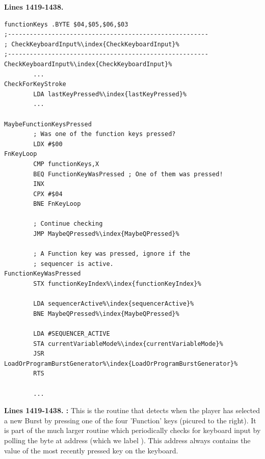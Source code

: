\clearpage
\textbf{Lines 1419-1438. }
\begin{lstlisting}[escapechar=\%]
functionKeys .BYTE $04,$05,$06,$03
;-------------------------------------------------------
; CheckKeyboardInput%\index{CheckKeyboardInput}%
;-------------------------------------------------------
CheckKeyboardInput%\index{CheckKeyboardInput}%   
        ...
CheckForKeyStroke   
        LDA lastKeyPressed%\index{lastKeyPressed}%
        ...

MaybeFunctionKeysPressed   
        ; Was one of the function keys pressed?
        LDX #$00
FnKeyLoop   
        CMP functionKeys,X
        BEQ FunctionKeyWasPressed ; One of them was pressed!
        INX 
        CPX #$04
        BNE FnKeyLoop

        ; Continue checking
        JMP MaybeQPressed%\index{MaybeQPressed}%

        ; A Function key was pressed, ignore if the 
        ; sequencer is active.
FunctionKeyWasPressed   
        STX functionKeyIndex%\index{functionKeyIndex}%

        LDA sequencerActive%\index{sequencerActive}%
        BNE MaybeQPressed%\index{MaybeQPressed}%

        LDA #SEQUENCER_ACTIVE
        STA currentVariableMode%\index{currentVariableMode}%
        JSR LoadOrProgramBurstGenerator%\index{LoadOrProgramBurstGenerator}%
        RTS 

        ...
\end{lstlisting}
\clearpage

\begin{figure}
%
\end{figure}
\textbf{Lines 1419-1438. :} This is the routine that detects when the player has selected a new
Burst by pressing one of the four 'Function' keys (picured to the right). It is part of the much larger routine  which periodically checks
for keyboard input by polling the byte at address  (which we label ). This address always
contains the value of the most recently pressed key on the keyboard.

